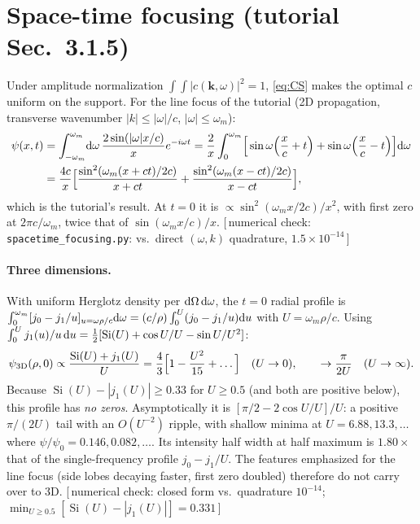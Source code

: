 \documentclass[11pt,letterpaper]{article}
\newcommand{\vect}[1]{\mathbf{#1}}
\newcommand{\kv}{\vect{k}}
\newcommand{\Si}{\operatorname{Si}}
\newcommand{\code}[1]{\texttt{\small #1}}
\newcommand{\numcheck}[1]{\hfill{\small\color{green!40!black}[\,numerical check: #1\,]}}
\begin{document}
\section{Space-time focusing (tutorial Sec.~3.1.5)}
Under amplitude normalization $\int\!\int|c(\kv,\omega)|^2=1$, \eqref{eq:CS} makes the optimal $c$ uniform on the support. For the line focus of the tutorial (2D propagation, transverse wavenumber $|k|\le|\omega|/c$, $|\omega|\le\omega_m$):
\begin{align}
    \psi(x,t)&=\int_{-\omega_m}^{\omega_m}\!{\rm d}\omega\,\frac{2\sin(|\omega|x/c)}{x}e^{-i\omega t}
    =\frac{2}{x}\int_0^{\omega_m}\!\Big[\sin\omega\Big(\frac xc+t\Big)+\sin\omega\Big(\frac xc-t\Big)\Big]{\rm d}\omega\nonumber\\
    &=\frac{4c}{x}\Big[\frac{\sin^2(\omega_m(x+ct)/2c)}{x+ct}+\frac{\sin^2(\omega_m(x-ct)/2c)}{x-ct}\Big],
\end{align}
which is the tutorial's result. At $t=0$ it is $\propto\sin^2(\omega_mx/2c)/x^2$, with first zero at $2\pi c/\omega_m$, twice that of $\sin(\omega_mx/c)/x$.
\numcheck{\code{spacetime\_focusing.py}: vs.\ direct $(\omega,k)$ quadrature, $1.5\times10^{-14}$}

\paragraph{Three dimensions.} With uniform Herglotz density per ${\rm d}\Omega\,{\rm d}\omega$, the $t=0$ radial profile is $\int_0^{\omega_m}[j_0-j_1/u]_{u=\omega\rho/c}{\rm d}\omega=(c/\rho)\int_0^U(j_0-j_1/u){\rm d}u$ with $U=\omega_m\rho/c$. Using $\int_0^U j_1(u)/u\,{\rm d}u=\tfrac12[\Si(U)+\cos U/U-\sin U/U^2]$:
\begin{align}
    \psi_{\rm 3D}(\rho,0)\propto\frac{\Si(U)+j_1(U)}{U}=\frac43\Big[1-\frac{U^2}{15}+\dots\Big]\quad(U\to0),\qquad \to\frac{\pi}{2U}\quad(U\to\infty).
\end{align}
Because $\Si(U)-|j_1(U)|\ge0.33$ for $U\ge0.5$ (and both are positive below), this profile has \emph{no zeros}. Asymptotically it is $[\pi/2-2\cos U/U]/U$: a positive $\pi/(2U)$ tail with an $O(U^{-2})$ ripple, with shallow minima at $U=6.88,13.3,\dots$ where $\psi/\psi_0=0.146,0.082,\dots$. Its intensity half width at half maximum is $1.80\times$ that of the single-frequency profile $j_0-j_1/U$. The features emphasized for the line focus (side lobes decaying faster, first zero doubled) therefore do not carry over to 3D.
\numcheck{closed form vs.\ quadrature $10^{-14}$; $\min_{U\ge0.5}[\Si(U)-|j_1(U)|]=0.331$}
\end{document}
